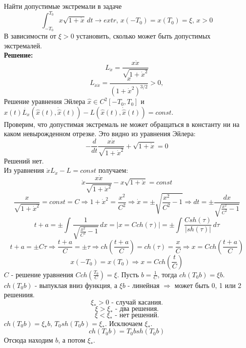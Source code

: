 \begin{task}
    Найти допустимые экстремали в задаче
    \[  \int_{-T_{0}}^{T_{0}} x\sqrt{1 + \dot{x}} \,dt \rightarrow extr\text{, }x(-T_{0}) = x(T_{0}) = \xi\text{, } x > 0 \]
    В зависимости от $\xi > 0$ установить, сколько может быть допустимых экстремалей. \\
    \textbf{Решение:} \\
    \[L_{\dot{x}} = \frac{x\dot{x}}{\sqrt{1 + \dot{x}^2}}\]
    \[L_{\dot{x}\dot{x}} = \frac{x}{(1 + \dot{x}^2)^{3/2}} > 0,\]
    Решение уравнения Эйлера $\hat{x} \in C^2[-T_{0}, T_{0}]$ и $\hat{x}(t)\dot{L_{x}}(\hat{x}(t),
        \dot{\hat{x}}(t)) - L(\hat{x}(t),
        \dot{\hat{x}}(t)) = const$.\\
    Проверим, что допустимая экстремаль не может обращаться в константу ни на каком невырожденном отрезке. Это видно из уравнения Эйлера:
    \[-\frac{d}{dt} \frac{x\dot{x}}{\sqrt{1 + \dot{x}^2}} + \sqrt{1 + \dot{x}} = 0\]
    Решений нет. \\
    Из уравнения $\dot{x}L_{\dot{x}} - L = const$ получаем: \\
    \[ \dot{x} \frac{x\dot{x}}{\sqrt{1 + \dot{x}^2}} - x\sqrt{1 + \dot{x}} = const\]
    \[\frac{x}{\sqrt{1 + \dot{x}^2}} = const = C \Rightarrow 1 + \dot{x}^2 = \frac{x^2}{C^2} \Rightarrow \dot{x} = \pm \sqrt{\frac{x^2}{C^2} - 1} \Rightarrow dt = \pm \frac{dx}{\sqrt{\frac{x^2}{C^2} - 1}}\]
    \[t + a = \pm \int_{}^{}\frac{1}{\sqrt{\frac{x^2}{C^2} - 1}} \,dx = \left| x = Cch(\tau) \right| = \pm \int_{}^{}\frac{C sh(\tau)}{|sh(\tau)|} \,d\tau \]
    \[t + a = \pm C\tau \Rightarrow \frac{t+a}{C} = \pm \tau \Rightarrow ch\left(\frac{t+a}{C}\right) = ch(\tau) = \frac{x}{C} \Rightarrow x = Cch\left(\frac{t+a}{C}\right)\]
    \[x(-T_{0}) = x(T_{0}) \Rightarrow x = Cch\left(\frac{t}{C}\right)\]
    $C$ - решение уравнения $Cch\left(\frac{T_{0}}{C}\right) = \xi$. Пусть $b = \frac{1}{C}$, тогда $ch(T_{0}b) = \xi b$. $ch(T_{0}b)$ - выпуклая вниз функция, а $\xi b$ - линейная $\Rightarrow$ может быть 0, 1 или 2 решениия.
    \[\xi_{*} > 0 \text{ - случай касания.}\]
    \[\xi > \xi_{*} \text{ - два решения.}\]
    \[\xi < \xi_{*} \text{ - нет решений.}\]
    $ch(T_{0}b) = \xi_{*}b$, $T_{0}sh(T_{0}b) = \xi_{*}$. Исключаем $\xi_{*}$.
    \[ch(T_{0}b) = T_{0}bsh(T_{0}b)\]
    Отсюда находим $b$, а потом $\xi_{*}$.
\end{task}